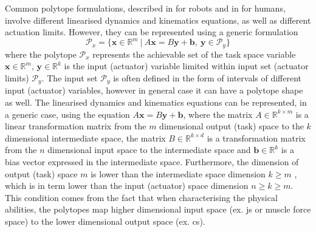 Common polytope formulations, described in  for robots and in  for humans, involve different linearised dynamics and kinematics equations, as well as different actuation limits. However, they can be represented using a generic formulation
\begin{equation}
    \mathcal{P}_x = \{\bm{x}\in\mathbb{R}^m ~|~ A\bm{x}=B\bm{y} + \bm{b}, ~ \bm{y}\in\mathcal{P}_y\}
    \label{eq:generic_polyt_view}
\end{equation}
where the polytope $\mathcal{P}_x$ represents the achievable set of the task space variable $\bm{x}\in\mathbb{R}^m$, $\bm{y}\in\mathbb{R}^k$ is the input (actuator) variable limited within input set (actuator limits) $\mathcal{P}_y$. The input set $\mathcal{P}_y$ is often defined in the form of intervals of different input (actuator) variables, however in general case it can have a polytope shape as well. The linearised dynamics and kinematics equations can be represented, in a generic case, using the equation $A\bm{x}\!=\!B\bm{y}\!+\!\bm{b}$, where the matrix $A\in\mathbb{R}^{k\times m}$ is a linear transformation matrix from the $m$ dimensional output (task) space to the $k$ dimensional intermediate space, the matrix $B\in\mathbb{R}^{k\times d}$ is a transformation matrix from the $n$ dimensional input space to the intermediate space and $\bm{b}\in\mathbb{R}^k$ is a bias vector expressed in the intermediate space. Furthermore, the dimension of output (task) space $m$ is lower than the intermediate space dimension $k\!\geq\! m$ , which is in term lower than the input (actuator) space dimension $n\!\geq\! k\!\geq\! m$. This condition comes from the fact that when characterising the physical abilities, the polytopes map higher dimensional input space (ex. \gls{js} or muscle force space) to the lower dimensional output space (ex. \gls{cs}).

